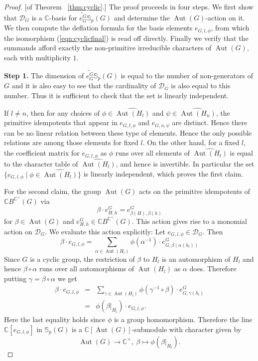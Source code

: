 \documentclass[10pt,a4paper]{amsart}
\newcommand{\Aut}{\operatorname{Aut}}
\newcommand{\MonG}{\mathbb C B^{\mathbb C^\times}(G)}
\newcommand{\kerlin}{\mathbb S_p}
\begin{document}
\begin{proof}{[of Theorem ~\ref{thm:cyclic}.]}
The proof proceeds in four steps. We first show that $\mathcal{D}_G$ is a $\mathbb C$-basis for $\widetilde{e_G^G}\kerlin(G)$ and determine the $\Aut(G)$-action on it. We then compute the deflation formula for the basis elements $e_{G,l,\phi}$, from which the isomorphism (\ref{eqn:cyclicfinal}) is read off directly. Finally we verify that the summands afford exactly the non-primitive irreducible characters of $\Aut(G)$, each with multiplicity $1$.

\textbf{Step 1.} The dimension of $\widetilde{e_G^G} \kerlin(G)$ is equal to the number of non-generators of $G$ and it is also easy to see that the cardinality of $\mathcal{D}_G$ is also equal to this number. Thus it is sufficient to check that the set is linearly independent.

If $l\not = n$, then for any choices of $\phi\in\widehat{\Aut(H_l)}$ and $\psi\in\widehat{\Aut(H_n)}$, the primitive idempotents that appear in $e_{G, l, \phi}$ and $e_{G, n, \psi}$ are distinct. Hence there can be no linear relation between these type of elements. Hence the only possible relations are among those elements for fixed $l$. On the other hand, for a fixed $l$, the coefficient matrix for $e_{G, l, \phi}$ as $\phi$ runs over all elements of $\widehat{\Aut(H_l)}$ is equal to the character table of $\widehat{\Aut(H_l)}$, and hence is invertible. In particular the set $\{ e_{G, l, \phi} \mid \phi\in\widehat{\Aut(H_l)}\}$ is linearly independent, which proves the first claim.

For the second claim, the group $\Aut(G)$ acts on the primitive idempotents of $\MonG$ via
\[
\beta\cdot e_{H, h}^G = e_{\beta(H), \beta(h)}^G
\]
for $\beta\in\Aut(G)$ and $e_{H, h}^G\in \MonG$. This action gives rise to a monomial action on $\mathcal{D}_G$. We evaluate this action explicitly: Let $e_{G, l, \phi}\in \mathcal{D}_G$. Then
\[
\beta\cdot e_{G, l, \phi} = \sum_{\alpha\in\Aut(H_l)} \phi(\alpha^{-1})\cdot e_{G, \beta(\alpha(h_l))}^G
\]
Since $G$ is a cyclic group, the restriction of $\beta$ to $H_l$ is an automorphism of $H_l$ and hence $\beta\circ \alpha$ runs over all automorphisms of $\Aut(H_l)$ as $\alpha$ does. Therefore putting $\gamma = \beta\circ \alpha$ we get
\begin{eqnarray*}
\beta\cdot e_{G, l, \phi} &=& \sum_{\gamma\in\Aut(H_l)} \phi(\gamma^{-1}\circ \beta)\cdot e_{G, \gamma(h_l)}^G\\
&=& \phi(\beta|_{H_l}) \cdot e_{G, l, \phi}.
\end{eqnarray*}
Here the last equality holds since $\phi$ is a group homomorphism. Therefore the line $\mathbb C[e_{G, l, \phi}]$ in $\kerlin(G)$ is a $\mathbb C[\Aut(G)]$-submodule with character given by
\begin{equation}
\Aut(G)\to \mathbb C^\times,\ \beta\mapsto \phi(\beta|_{H_l}).
\end{equation}


\end{proof}
\end{document}
